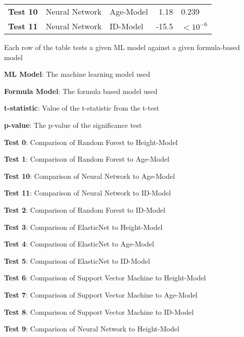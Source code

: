 \documentclass[11pt]{article}
\begin{document}
\begin{table}[h]
\begin{threeparttable}
{\begin{tabular}{lllrl}
\textbf{Test \raisebox{2ex}{\hypertarget{C10a}{}}10} & Neural Network & Age-Model & \raisebox{2ex}{\hypertarget{C10b}{}}1.18 & \raisebox{2ex}{\hypertarget{C10c}{}}0.239 \\
\textbf{Test \raisebox{2ex}{\hypertarget{C11a}{}}11} & Neural Network & ID-Model & \raisebox{2ex}{\hypertarget{C11b}{}}-15.5 & $<$\raisebox{2ex}{\hypertarget{C11c}{}}$10^{-6}$ \\
\bottomrule
\end{tabular}}
\begin{tablenotes}
\footnotesize
\item Each row of the table tests a given ML model against a given formula-based model
\item \textbf{ML Model}: The machine learning model used
\item \textbf{Formula Model}: The formula based model used
\item \textbf{t-statistic}: Value of the t-statistic from the t-test
\item \textbf{p-value}: The p-value of the significance test
\item \textbf{Test 0}: Comparison of Random Forest to Height-Model
\item \textbf{Test 1}: Comparison of Random Forest to Age-Model
\item \textbf{Test 10}: Comparison of Neural Network to Age-Model
\item \textbf{Test 11}: Comparison of Neural Network to ID-Model
\item \textbf{Test 2}: Comparison of Random Forest to ID-Model
\item \textbf{Test 3}: Comparison of ElasticNet to Height-Model
\item \textbf{Test 4}: Comparison of ElasticNet to Age-Model
\item \textbf{Test 5}: Comparison of ElasticNet to ID-Model
\item \textbf{Test 6}: Comparison of Support Vector Machine to Height-Model
\item \textbf{Test 7}: Comparison of Support Vector Machine to Age-Model
\item \textbf{Test 8}: Comparison of Support Vector Machine to ID-Model
\item \textbf{Test 9}: Comparison of Neural Network to Height-Model
\end{tablenotes}
\end{threeparttable}
\end{table}
\end{document}
